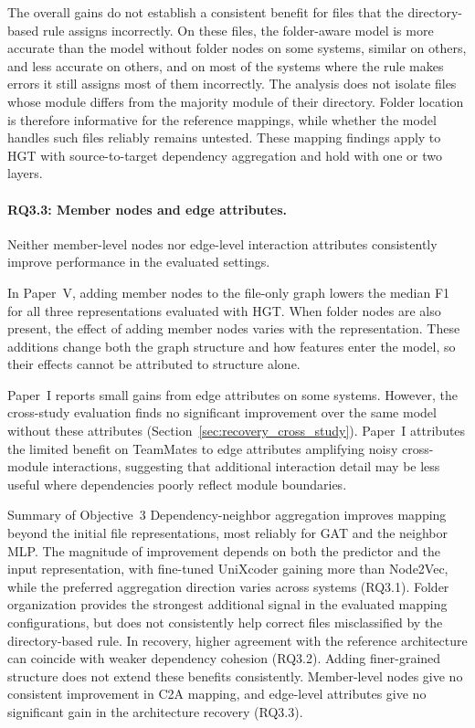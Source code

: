 The overall gains do not establish a consistent benefit for files that the directory-based rule assigns incorrectly. On these files, the folder-aware model is more accurate than the model without folder nodes on some systems, similar on others, and less accurate on others, and on most of the systems where the rule makes errors it still assigns most of them incorrectly. The analysis does not isolate files whose module differs from the majority module of their directory. Folder location is therefore informative for the reference mappings, while whether the model handles such files reliably remains untested. These mapping findings apply to HGT with source-to-target dependency aggregation and hold with one or two layers.

\paragraph{RQ3.3: Member nodes and edge attributes.} Neither member-level nodes nor edge-level interaction attributes consistently improve performance in the evaluated settings.

In Paper~V, adding member nodes to the file-only graph lowers the median F1 for all three representations evaluated with HGT. When folder nodes are also present, the effect of adding member nodes varies with the representation. These additions change both the graph structure and how features enter the model, so their effects cannot be attributed to structure alone.

Paper~I reports small gains from edge attributes on some systems. However, the cross-study evaluation finds no significant improvement over the same model without these attributes (Section~\ref{sec:recovery_cross_study}). Paper~I attributes the limited benefit on TeamMates to edge attributes amplifying noisy cross-module interactions, suggesting that additional interaction detail may be less useful where dependencies poorly reflect module boundaries.

\begin{GrayBox}{Summary of Objective~3}
Dependency-neighbor aggregation improves mapping beyond the initial file representations, most reliably for GAT and the neighbor MLP. The magnitude of improvement depends on both the predictor and the input representation, with fine-tuned UniXcoder gaining more than Node2Vec, while the preferred aggregation direction varies across systems (RQ3.1). Folder organization provides the strongest additional signal in the evaluated mapping configurations, but does not consistently help correct files misclassified by the directory-based rule. In recovery, higher agreement with the reference architecture can coincide with weaker dependency cohesion (RQ3.2). Adding finer-grained structure does not extend these benefits consistently. Member-level nodes give no consistent improvement in C2A mapping, and edge-level attributes give no significant gain in the architecture recovery (RQ3.3).
\end{GrayBox}
